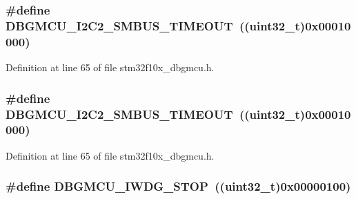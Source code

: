 \subsubsection[{\texorpdfstring{D\+B\+G\+M\+C\+U\+\_\+\+I2\+C2\+\_\+\+S\+M\+B\+U\+S\+\_\+\+T\+I\+M\+E\+O\+UT}{DBGMCU_I2C2_SMBUS_TIMEOUT}}]{\setlength{\rightskip}{0pt plus 5cm}\#define D\+B\+G\+M\+C\+U\+\_\+\+I2\+C2\+\_\+\+S\+M\+B\+U\+S\+\_\+\+T\+I\+M\+E\+O\+UT~(({\bf uint32\+\_\+t})0x00010000)}\hypertarget{group___d_b_g_m_c_u___exported___constants_ga316f8eba36b7a796dd3c6b7d6640b4bf}{}\label{group___d_b_g_m_c_u___exported___constants_ga316f8eba36b7a796dd3c6b7d6640b4bf}


Definition at line 65 of file stm32f10x\+\_\+dbgmcu.\+h.

\subsubsection[{\texorpdfstring{D\+B\+G\+M\+C\+U\+\_\+\+I2\+C2\+\_\+\+S\+M\+B\+U\+S\+\_\+\+T\+I\+M\+E\+O\+UT}{DBGMCU_I2C2_SMBUS_TIMEOUT}}]{\setlength{\rightskip}{0pt plus 5cm}\#define D\+B\+G\+M\+C\+U\+\_\+\+I2\+C2\+\_\+\+S\+M\+B\+U\+S\+\_\+\+T\+I\+M\+E\+O\+UT~(({\bf uint32\+\_\+t})0x00010000)}\hypertarget{group___d_b_g_m_c_u___exported___constants_ga316f8eba36b7a796dd3c6b7d6640b4bf}{}\label{group___d_b_g_m_c_u___exported___constants_ga316f8eba36b7a796dd3c6b7d6640b4bf}


Definition at line 65 of file stm32f10x\+\_\+dbgmcu.\+h.

\subsubsection[{\texorpdfstring{D\+B\+G\+M\+C\+U\+\_\+\+I\+W\+D\+G\+\_\+\+S\+T\+OP}{DBGMCU_IWDG_STOP}}]{\setlength{\rightskip}{0pt plus 5cm}\#define D\+B\+G\+M\+C\+U\+\_\+\+I\+W\+D\+G\+\_\+\+S\+T\+OP~(({\bf uint32\+\_\+t})0x00000100)}\hypertarget{group___d_b_g_m_c_u___exported___constants_ga5b8b38b5589a2e26a57325553b5dfe23}{}\label{group___d_b_g_m_c_u___exported___constants_ga5b8b38b5589a2e26a57325553b5dfe23}


